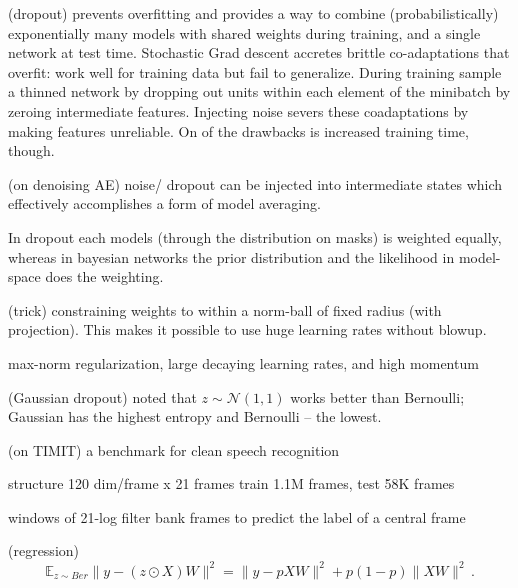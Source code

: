 (dropout)
prevents overfitting and provides a way to combine (probabilistically) exponentially
many models with shared weights during training, and a single network at test time.
Stochastic Grad descent accretes brittle co-adaptations that overfit: work well for training
data but fail to generalize. During training sample a thinned network by dropping out
units within each element of the minibatch by zeroing intermediate features. Injecting
noise severs these coadaptations by making features unreliable. On of the drawbacks
is increased training time, though.

(on denoising AE)
noise/ dropout can be injected into intermediate states which effectively accomplishes
a form of model averaging.

In dropout each models (through the distribution on masks) is weighted equally, whereas
in bayesian networks the prior distribution and the likelihood in model-space does the
weighting.

(trick)
constraining weights to within a norm-ball of fixed radius (with projection). This makes
it possible to use huge learning rates without blowup.

max-norm regularization, large decaying learning rates, and high momentum

(Gaussian dropout)
noted that $z\sim \mathcal{N}(1,1)$ works better than Bernoulli; Gaussian has the highest
entropy and Bernoulli -- the lowest.

(on TIMIT)
a benchmark for clean speech recognition

structure 120 dim/frame x 21 frames
train 1.1M frames, test 58K frames

windows of 21-log filter bank frames to predict the label of a central frame


(regression)
$$
\mathbb{E}_{z\sim {Ber}} \|y - (z\odot X) W\|^2
    = \|y - p X W\|^2
        + p(1 - p) \|X W \|^2
    \,. $$


